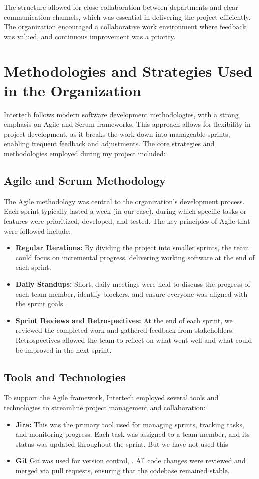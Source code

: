 \documentclass[a4paper,12pt]{report}
\begin{document}
The structure allowed for close collaboration between departments and clear communication channels, which was essential in delivering the project efficiently. The organization encouraged a collaborative work environment where feedback was valued, and continuous improvement was a priority.

\section{Methodologies and Strategies Used in the Organization}
Intertech follows modern software development methodologies, with a strong emphasis on Agile and Scrum frameworks. This approach allows for flexibility in project development, as it breaks the work down into manageable sprints, enabling frequent feedback and adjustments. The core strategies and methodologies employed during my project included:

\subsection*{Agile and Scrum Methodology}
The Agile methodology was central to the organization’s development process. Each sprint typically lasted a week (in our case), during which specific tasks or features were prioritized, developed, and tested. The key principles of Agile that were followed include:
\begin{itemize}
    \item \textbf{Regular Iterations:} By dividing the project into smaller sprints, the team could focus on incremental progress, delivering working software at the end of each sprint.
    \item \textbf{Daily Standups:} Short, daily meetings were held to discuss the progress of each team member, identify blockers, and ensure everyone was aligned with the sprint goals.
    \item \textbf{Sprint Reviews and Retrospectives:} At the end of each sprint, we reviewed the completed work and gathered feedback from stakeholders. Retrospectives allowed the team to reflect on what went well and what could be improved in the next sprint.
\end{itemize}

\subsection*{Tools and Technologies}
To support the Agile framework, Intertech employed several tools and technologies to streamline project management and collaboration:
\begin{itemize}
    \item \textbf{Jira:} This was the primary tool used for managing sprints, tracking tasks, and monitoring progress. Each task was assigned to a team member, and its status was updated throughout the sprint. But we have not used this
    \item \textbf{Git} Git was used for version control, . All code changes were reviewed and merged via pull requests, ensuring that the codebase remained stable.
\end{itemize}
\end{document}
